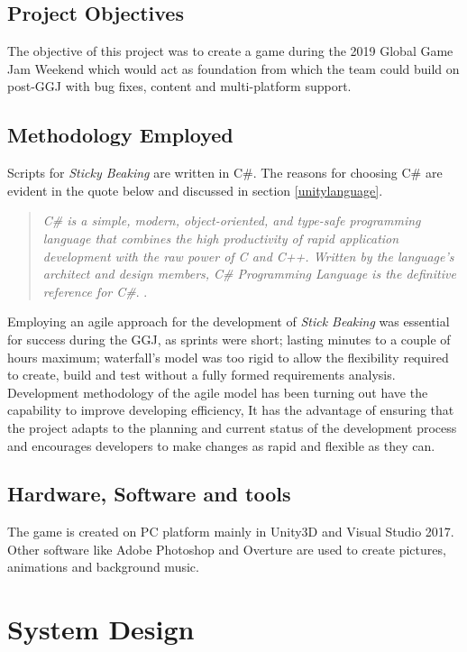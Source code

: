 \documentclass[12pt]{article}
\newcommand{\game}[2]{\textit{#1}}{}
\begin{document}
\subsection{Project Objectives}
The objective of this project was to create a game during the 2019 Global Game Jam Weekend which would act as foundation from which the team could build on post-GGJ with bug fixes, content and multi-platform support.         

\subsection{Methodology Employed}
Scripts for \game{Sticky Beaking}{ } are written in C\#. The reasons for choosing C\# are evident in the quote below and discussed in section \ref{unitylanguage}.

\begin{quotation}
\emph{C\# is a simple, modern, object-oriented, and type-safe programming language that combines the high productivity of rapid application development with the raw power of C and C++. Written by the language's architect and design members, C\# Programming Language is the definitive reference for C\#}. \cite{hejlsberg2003c}.  
\end{quotation}

Employing an agile approach for the development of \game{Stick Beaking}{ } was essential for success during the GGJ, as sprints were short; lasting minutes to a couple of hours maximum; waterfall's model was too rigid to allow the flexibility required to create, build and test without a fully formed requirements analysis. Development methodology of the agile model has been turning out have the capability to improve developing efficiency, It has the advantage of ensuring that the project adapts to the planning and current status of the development process and encourages developers to make changes as rapid and flexible as they can\cite{lee2010toward}\cite{dybaa2008empirical}.

\subsection{Hardware, Software and tools}

The game is created on PC platform mainly in Unity3D and Visual Studio 2017. Other software like Adobe Photoshop and Overture are used to create pictures, animations and background music. 

\section{System Design}
\end{document}
